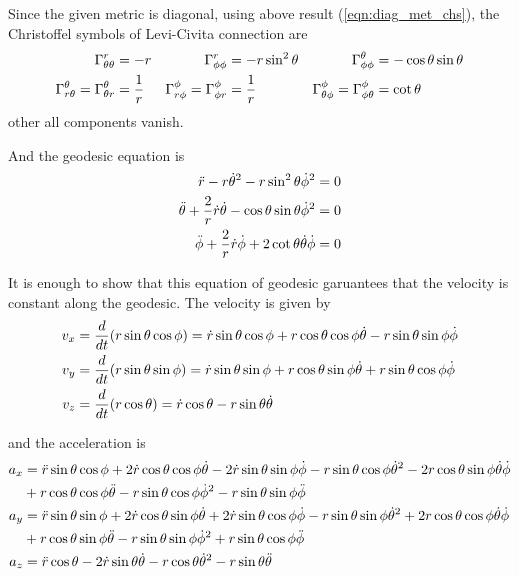 \documentclass[a4paper,11pt]{article}
\begin{document}
Since the given metric is diagonal, using above result (\ref{eqn:diag_met_chs}), the Christoffel symbols of Levi-Civita connection are
\begin{align}
    \Gamma^{r}_{\theta\theta} &= -r & \Gamma^{r}_{\phi\phi} &= -r\sin^2\theta & \Gamma^{\theta}_{\phi\phi} &= -\cos\theta\sin\theta\notag\\
    \Gamma^{\theta}_{r\theta} = \Gamma^{\theta}_{\theta r} &= \frac{1}{r} & \Gamma^{\phi}_{r\phi} = \Gamma^{\phi}_{\phi r} &= \frac{1}{r} & \Gamma^{\phi}_{\theta\phi} = \Gamma^{\phi}_{\phi\theta} &= \cot\theta
\end{align}
other all components vanish.

And the geodesic equation is 
\begin{align}
    \ddot{r} - r\dot{\theta}^2 - r\sin^2\theta \dot{\phi}^2 &= 0\notag\\
    \ddot{\theta} + \frac{2}{r}\dot{r}\dot{\theta} - \cos\theta\sin\theta \dot{\phi}^2 &= 0\notag\\
    \ddot{\phi} + \frac{2}{r}\dot{r}\dot{\phi} + 2\cot\theta \dot{\theta}\dot{\phi} &= 0 \label{eqn:geodesic_eqn}
\end{align}


It is enough to show that this equation of geodesic garuantees that the velocity is constant along the geodesic. The velocity is given by
\begin{align}
    v_x &= \frac{d}{dt}(r\sin\theta\cos\phi) = \dot{r}\sin\theta\cos\phi + r\cos\theta\cos\phi \dot{\theta} - r\sin\theta\sin\phi \dot{\phi}\notag\\
    v_y &= \frac{d}{dt}(r\sin\theta\sin\phi) = \dot{r}\sin\theta\sin\phi + r\cos\theta\sin\phi \dot{\theta} + r\sin\theta\cos\phi \dot{\phi}\notag\\
    v_z &= \frac{d}{dt}(r\cos\theta) = \dot{r}\cos\theta - r \sin\theta \dot{\theta}
\end{align}

and the acceleration is
\begin{align}
    a_x &= \ddot{r}\sin\theta\cos\phi + 2\dot{r}\cos\theta\cos\phi \dot{\theta} - 2 \dot{r}\sin\theta\sin\phi \dot{\phi} - r\sin\theta\cos\phi \dot{\theta}^2 - 2 r\cos\theta\sin\phi \dot{\theta}\dot{\phi} \\
    &+ r\cos\theta\cos\phi \ddot{\theta} -r\sin\theta\cos\phi \dot{\phi}^2 -r\sin\theta\sin\phi \ddot{\phi}\notag\\
    a_y &= \ddot{r}\sin\theta\sin\phi + 2\dot{r}\cos\theta\sin\phi \dot{\theta} + 2 \dot{r}\sin\theta\cos\phi \dot{\phi} - r\sin\theta\sin\phi \dot{\theta}^2 + 2 r\cos\theta\cos\phi \dot{\theta}\dot{\phi} \\
    &+ r\cos\theta\sin\phi \ddot{\theta} -r\sin\theta\sin\phi \dot{\phi}^2 + r\sin\theta\cos\phi \ddot{\phi}\notag\\
    a_z &= \ddot{r}\cos\theta - 2\dot{r}\sin\theta \dot{\theta} - r\cos\theta \dot{\theta}^2 - r\sin\theta \ddot{\theta}
\end{align}
\end{document}
